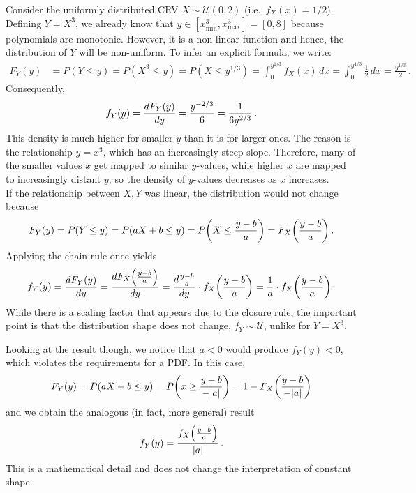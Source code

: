 \begin{ex}\label{ex:non_lin_vs_lin_1}
Consider the uniformly distributed CRV $X \sim \mathcal{U}(0, 2)$ (i.e.~$f_X(x) = 1 / 2$). Defining $Y = X^3$, we already know that $y \in [x_\text{min}^3, x_\text{max}^3] = [0, 8]$ because polynomials are monotonic. However, it is a non-linear function and hence, the distribution of $Y$ will be non-uniform. To infer an explicit formula, we write:
\begin{align*}
F_Y(y) &= P(Y \leq y) = P(X^3 \leq y) = P(X \leq y^{1 / 3}) = \int_0^{y^{1 / 3}} f_X(x) \, dx = \int_0^{y^{1 / 3}} \frac{1}{2} \, dx = \frac{y^{1 / 3}}{2} \, .
\end{align*}
Consequently,
\begin{equation*}
f_Y(y) = \dv{F_Y(y)}{y} = \frac{y^{- 2 / 3}}{6} = \frac{1}{6 y^{2 / 3}} \, .
\end{equation*}
This density is much higher for smaller $y$ than it is for larger ones. The reason is the relationship $y = x^3$, which has an increasingly steep slope. Therefore, many of the smaller values $x$ get mapped to similar $y$-values, while higher $x$ are mapped to increasingly distant $y$, so the density of $y$-values decreases as $x$ increases.\\


If the relationship between $X, Y$ was linear, the distribution would not change because
\begin{equation*}
F_Y(y) = P(Y \leq y) = P(a X + b \leq y) = P\qty(X \leq \frac{y - b}{a}) = F_X\qty(\frac{y - b}{a}) \, .
\end{equation*}
Applying the chain rule once yields
\begin{equation*}
f_Y(y) = \dv{F_Y(y)}{y} = \dv{F_X\qty(\frac{y - b}{a})}{y} = \dv{\frac{y - b}{a}}{y} \cdot f_X\qty(\frac{y - b}{a}) = \frac{1}{a} \cdot f_X\qty(\frac{y - b}{a}) \, .%
\end{equation*}
While there is a scaling factor that appears due to the closure rule, the important point is that the distribution shape does not change, $f_Y \sim \mathcal{U}$, unlike for $Y = X^3$.

Looking at the result though, we notice that $a < 0$ would produce $f_Y(y) < 0$, which violates the requirements for a PDF. In this case,
\begin{equation*}
F_Y(y) = P(a X + b \leq y) = P\qty(x \geq \frac{y - b}{- \abs{a}}) = 1 - F_X\qty(\frac{y - b}{- \abs{a}})
\end{equation*}
and we obtain the analogous (in fact, more general) result
\begin{equation*}
f_Y(y) = \frac{f_X\qty(\frac{y - b}{a})}{\abs{a}} \, .
\end{equation*}
This is a mathematical detail and does not change the interpretation of constant shape.

\end{ex}


